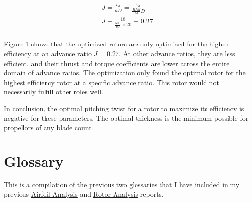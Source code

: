 \documentclass{article}
\begin{document}
\begin{equation}
\begin{aligned}
	J = \frac{v_{a}}{nD} = \frac{v_{a}}{\frac{RPM}{60}D} \\
	J = \frac{18}{\frac{500}{60} \times 20} = 0.27 \\
\end{aligned}
\end{equation} 

Figure 1 shows that the optimized rotors are only optimized for the highest efficiency at an advance ratio $J = 0.27$. At other advance ratios, they are less efficient, and their thrust and torque coefficients are lower across the entire domain of advance ratios. The optimization only found the optimal rotor for the highest efficiency rotor at a specific advance ratio. This rotor would not necessarily fulfill other roles well. \newline

In conclusion, the optimal pitching twist for a rotor to maximize its efficiency is negative for these parameters. The optimal thickness is the minimum possible for propellors of any blade count. \newline

\clearpage

\section{Glossary}

This is a compilation of the previous two glossaries that I have included in my previous \href{https://github.com/JoeSpencer1/497R-Projects/blob/Rotor-Analysis/Airfoil Analysis/Airfoil_Analysis.pdf}{Airfoil Analysis} and \href{https://github.com/JoeSpencer1/497R-Projects/blob/Rotor-Analysis/Rotor Analysis/Rotor_Analysis.pdf}{Rotor Analysis} reports.
\end{document}
